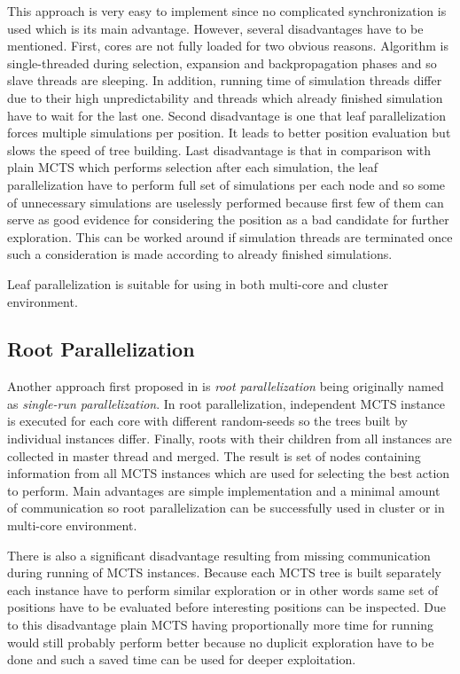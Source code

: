 This approach is very easy to implement since no complicated synchronization is used
which is its main advantage. However, several disadvantages have to be mentioned. First, cores are
not fully loaded for two obvious reasons. Algorithm is single-threaded during selection, expansion
and backpropagation phases and so slave threads are sleeping. In addition, running time of
simulation threads differ due to their high unpredictability and threads which already finished
simulation have to wait for the last one. Second disadvantage is one that leaf parallelization
forces multiple simulations
per position. It leads to better position evaluation but slows the speed of tree building. Last
disadvantage is that in comparison with plain MCTS which performs selection after each simulation,
the leaf parallelization have to perform full set of simulations per each node and so some of
unnecessary simulations are uselessly performed because first few of them can serve as good evidence
for considering the position as a bad candidate for further exploration. This can be worked around
if simulation threads are terminated once such a consideration is made according to already finished
simulations.

Leaf parallelization is suitable for using in both multi-core and cluster environment.


\subsection{Root Parallelization}


Another approach first proposed in \cite{Cazenave2007} is \emph{root parallelization} being
originally named as \emph{single-run parallelization}. In root parallelization, independent
MCTS instance is executed for each core with different random-seeds so the trees built by individual
instances differ. Finally, roots with their children from all instances are collected in master
thread and merged. The result is set of nodes containing information from all MCTS instances which
are used for selecting the best action to perform. Main advantages are simple implementation and a
minimal amount of communication so root parallelization can be successfully used in cluster
or in multi-core environment.

There is also a significant disadvantage resulting from missing communication during running of MCTS
instances. Because each MCTS tree is built separately each instance have to perform similar
exploration or in other words same set of positions have to be evaluated before interesting
positions can be inspected. Due to this disadvantage plain MCTS having proportionally more time for
running would still probably perform better because no duplicit exploration have to be done and such
a saved time can be used for deeper exploitation.

